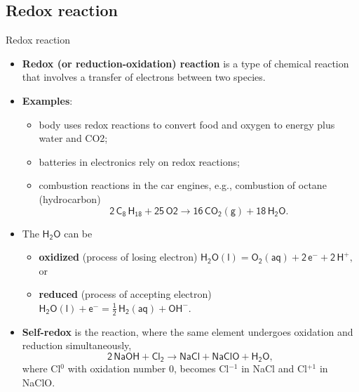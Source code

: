 \subsection{Redox reaction}
%	
%
\begin{frame}{Redox reaction}
	\small
	\begin{itemize}
		\item \alert{\textbf{Redox (or reduction-oxidation) reaction}} is a type of chemical reaction that involves a transfer 
		of electrons between two species.
		\pause
		\item { \bf Examples}: 
		\begin{itemize}
				\item body uses redox reactions to convert food and oxygen to energy plus water and CO2;
				\item batteries in electronics rely on redox reactions;
				\item combustion reactions in the car engines, e.g., combustion of octane (hydrocarbon)
				\[
				\mathsf{2 \, C_8\, H_{18} + 25\,O2 \rightarrow 16\, CO_2(g) + 18\,H_2O}.
				\]			
		\end{itemize}
		\pause
		\item The $\mathsf{H_2O}$ can be 
		\begin{itemize}
			\item \alert{\bf oxidized} (process of losing electron)
			$\mathsf{H_2O(l) = O_2(aq) + 2\, e^{-} + 2\, H^+,}$ or 
			
			\item \alert{\bf reduced} (process of accepting electron)
			$
			\mathsf{H_2O(l) + e^{-} = \tfrac{1}{2} \, H_2(aq) + OH^-.}$
		\end{itemize}
		\pause
		\item \alert{\bf Self-redox} is the reaction, where the same element undergoes oxidation and reduction simultaneously,  
		\[
		\mathsf{2\, NaOH + Cl_2 \rightarrow NaCl + NaClO + H_2O,}
		\]
		where Cl$^0$ with oxidation number 0, becomes Cl$^{-1}$  in NaCl and Cl$^{+1}$  in NaClO. 
	\end{itemize}
\end{frame}

